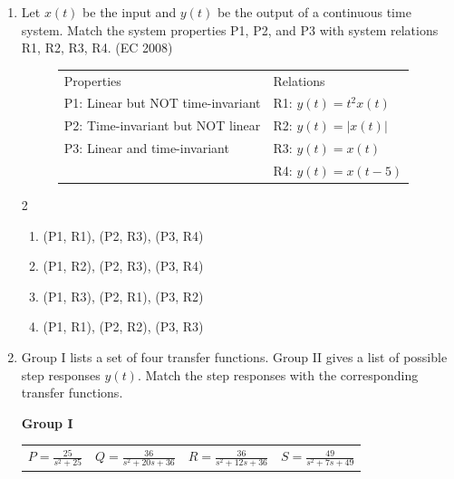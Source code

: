 \begin{enumerate}[label=\thesubsection.\arabic*,ref=\thesubsection.\theenumi]
\hfill (EC 2008)
\begin{multicols}{4}
\begin{enumerate}
    \item $\pi,\,2\pi$
    \item $0.5\pi,\,1.5\pi$
    \item $0,\,\pi$
    \item $2\pi,\,2.5\pi$
\end{enumerate}
\end{multicols}
\item Let $x(t)$ be the input and $y(t)$ be the output of a continuous time system. Match the system properties P1, P2, and P3 with system relations R1, R2, R3, R4.
\hfill (EC 2008)
\begin{figure}[H]\centering
  \begin{tabular}{ll}
    Properties & Relations \\
    P1: Linear but NOT time-invariant              & R1: $y(t)=t^2 x(t) $ \\
    P2: Time-invariant but NOT linear              & R2: $y(t)=|x(t)| $ \\
    P3: Linear and time-invariant                  & R3: $y(t)=x(t)$ \\
                                                  & R4: $y(t)=x(t-5)$
  \end{tabular}
\caption{}
\label{fig:q11}
\end{figure}
\begin{multicols}{2}
\begin{enumerate}
  \item (P1, R1), (P2, R3), (P3, R4)
  \item (P1, R2), (P2, R3), (P3, R4)
  \item (P1, R3), (P2, R1), (P3, R2)
  \item (P1, R1), (P2, R2), (P3, R3)
\end{enumerate}
\end{multicols}
\item
Group I lists a set of four transfer functions. Group II gives a list of possible step responses $y(t)$. Match the step responses with the corresponding transfer functions.

\textbf{Group I}

\begin{tabular}{llll}
  $P = \frac{25}{s^2 + 25 }$ &
  $Q = \frac{36}{s^2 + 20s + 36}$ &
  $R = \frac{36}{s^2 + 12s + 36 }$ &
  $S = \frac{49}{s^2 + 7s + 49}$
\end{tabular}


\end{enumerate}
